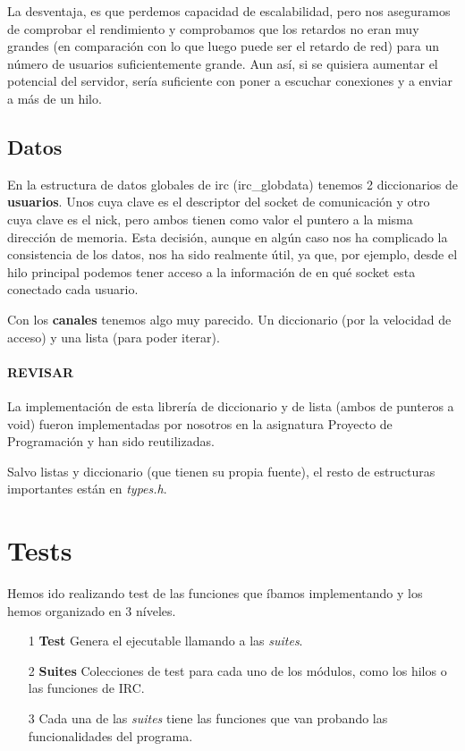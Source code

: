 \documentclass[nochap]{apuntes}
\begin{document}
La desventaja, es que perdemos capacidad de escalabilidad, pero nos aseguramos de comprobar el rendimiento y comprobamos que los retardos no eran muy grandes (en comparación con lo que luego puede ser el retardo de red) para un número de usuarios suficientemente grande. Aun así, si se quisiera aumentar el potencial del servidor, sería suficiente con poner a escuchar conexiones y a enviar a más de un hilo.

\subsection{Datos}

En la estructura de datos globales de irc (irc\_globdata) tenemos 2 diccionarios de \textbf{usuarios}. Unos cuya clave es el descriptor del socket de comunicación y otro cuya clave es el nick, pero ambos tienen como valor el puntero a la misma dirección de memoria. Esta decisión, aunque en algún caso nos ha complicado la consistencia de los datos, nos ha sido realmente útil, ya que, por ejemplo, desde el hilo principal podemos tener acceso a la información de en qué socket esta conectado cada usuario.

Con los \textbf{canales} tenemos algo muy parecido. Un diccionario (por la velocidad de acceso) y una lista (para poder iterar).

\paragraph{REVISAR}
La implementación de esta librería de diccionario y de lista (ambos de punteros a void) fueron implementadas por nosotros en la asignatura Proyecto de Programación y han sido reutilizadas. 

Salvo listas y diccionario (que tienen su propia fuente), el resto de estructuras importantes están en \textit{types.h}.


\section{Tests}
Hemos ido realizando test de las funciones que íbamos implementando y los hemos organizado en 3 níveles. 

\begin{itemize}
\item[1] \textbf{Test} Genera el ejecutable llamando a las \textit{suites}.
\item[2] \textbf{Suites} Colecciones de test para cada uno de los módulos, como los hilos o las funciones de IRC.
\item[3] Cada una de las \textit{suites} tiene las funciones que van probando las funcionalidades del programa.
\end{itemize}
\end{document}
